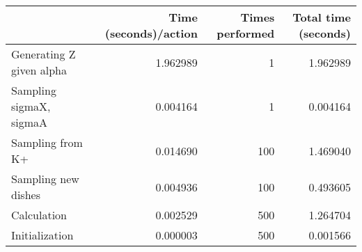 \begin{tabular}{lrrr}
\toprule
{} &  Time (seconds)/action &  Times performed &  Total time (seconds) \\
\midrule
Generating Z given alpha &               1.962989 &                1 &              1.962989 \\
Sampling sigmaX, sigmaA  &               0.004164 &                1 &              0.004164 \\
Sampling from K+         &               0.014690 &              100 &              1.469040 \\
Sampling new dishes      &               0.004936 &              100 &              0.493605 \\
Calculation              &               0.002529 &              500 &              1.264704 \\
Initialization           &               0.000003 &              500 &              0.001566 \\
\bottomrule
\end{tabular}
